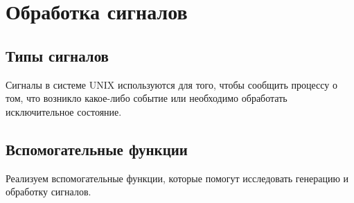 
\section{Обработка сигналов}

\subsection{Типы сигналов}

Сигналы в системе UNIX  используются для того, чтобы сообщить процессу о том, что возникло какое-либо событие или необходимо обработать исключительное состояние. 


\subsection{Вспомогательные функции}

Реализуем вспомогательные функции, которые помогут исследовать генерацию и обработку сигналов.





